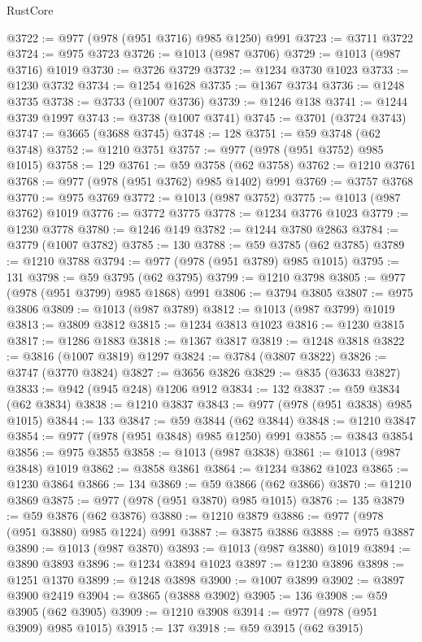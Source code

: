 \begin{lexlean}{RustCore}
\begin{coremodule}
@3722 := @977 (@978 (@951 @3716) @985 @1250) @991
@3723 := @3711 @3722
@3724 := @975 @3723
@3726 := @1013 (@987 @3706)
@3729 := @1013 (@987 @3716) @1019
@3730 := @3726 @3729
@3732 := @1234 @3730 @1023
@3733 := @1230 @3732
@3734 := @1254 @1628
@3735 := @1367 @3734
@3736 := @1248 @3735
@3738 := @3733 (@1007 @3736)
@3739 := @1246 @138
@3741 := @1244 @3739 @1997
@3743 := @3738 (@1007 @3741)
@3745 := @3701 (@3724 @3743)
@3747 := @3665 (@3688 @3745)
@3748 := 128
@3751 := @59 @3748 (@62 @3748)
@3752 := @1210 @3751
@3757 := @977 (@978 (@951 @3752) @985 @1015)
@3758 := 129
@3761 := @59 @3758 (@62 @3758)
@3762 := @1210 @3761
@3768 := @977 (@978 (@951 @3762) @985 @1402) @991
@3769 := @3757 @3768
@3770 := @975 @3769
@3772 := @1013 (@987 @3752)
@3775 := @1013 (@987 @3762) @1019
@3776 := @3772 @3775
@3778 := @1234 @3776 @1023
@3779 := @1230 @3778
@3780 := @1246 @149
@3782 := @1244 @3780 @2863
@3784 := @3779 (@1007 @3782)
@3785 := 130
@3788 := @59 @3785 (@62 @3785)
@3789 := @1210 @3788
@3794 := @977 (@978 (@951 @3789) @985 @1015)
@3795 := 131
@3798 := @59 @3795 (@62 @3795)
@3799 := @1210 @3798
@3805 := @977 (@978 (@951 @3799) @985 @1868) @991
@3806 := @3794 @3805
@3807 := @975 @3806
@3809 := @1013 (@987 @3789)
@3812 := @1013 (@987 @3799) @1019
@3813 := @3809 @3812
@3815 := @1234 @3813 @1023
@3816 := @1230 @3815
@3817 := @1286 @1883
@3818 := @1367 @3817
@3819 := @1248 @3818
@3822 := @3816 (@1007 @3819) @1297
@3824 := @3784 (@3807 @3822)
@3826 := @3747 (@3770 @3824)
@3827 := @3656 @3826
@3829 := @835 (@3633 @3827)
@3833 := @942 (@945 @248) @1206 @912
@3834 := 132
@3837 := @59 @3834 (@62 @3834)
@3838 := @1210 @3837
@3843 := @977 (@978 (@951 @3838) @985 @1015)
@3844 := 133
@3847 := @59 @3844 (@62 @3844)
@3848 := @1210 @3847
@3854 := @977 (@978 (@951 @3848) @985 @1250) @991
@3855 := @3843 @3854
@3856 := @975 @3855
@3858 := @1013 (@987 @3838)
@3861 := @1013 (@987 @3848) @1019
@3862 := @3858 @3861
@3864 := @1234 @3862 @1023
@3865 := @1230 @3864
@3866 := 134
@3869 := @59 @3866 (@62 @3866)
@3870 := @1210 @3869
@3875 := @977 (@978 (@951 @3870) @985 @1015)
@3876 := 135
@3879 := @59 @3876 (@62 @3876)
@3880 := @1210 @3879
@3886 := @977 (@978 (@951 @3880) @985 @1224) @991
@3887 := @3875 @3886
@3888 := @975 @3887
@3890 := @1013 (@987 @3870)
@3893 := @1013 (@987 @3880) @1019
@3894 := @3890 @3893
@3896 := @1234 @3894 @1023
@3897 := @1230 @3896
@3898 := @1251 @1370
@3899 := @1248 @3898
@3900 := @1007 @3899
@3902 := @3897 @3900 @2419
@3904 := @3865 (@3888 @3902)
@3905 := 136
@3908 := @59 @3905 (@62 @3905)
@3909 := @1210 @3908
@3914 := @977 (@978 (@951 @3909) @985 @1015)
@3915 := 137
@3918 := @59 @3915 (@62 @3915)

\end{coremodule}
\end{lexlean}
